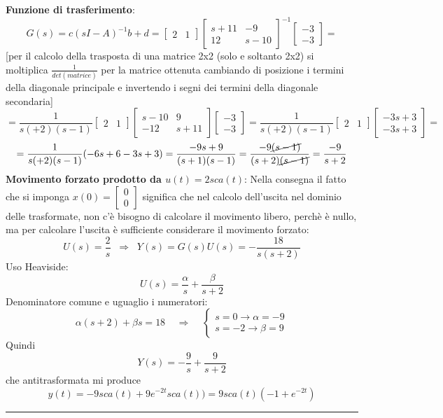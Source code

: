 \textbf{Funzione di trasferimento}:
\[
    G(s) = c(sI-A)^{-1} b +d = \left[\begin{matrix}
        2 &1
    \end{matrix}\right] \left[\begin{matrix}
        s+11 & -9 \\ 12 & s-10
    \end{matrix}\right]^{-1} \left[\begin{matrix}
        -3\\-3
    \end{matrix}\right] =
\]
[per il calcolo della trasposta di una matrice 2x2 (solo e soltanto 2x2) si moltiplica $\frac{1}{det(matrice)}$ per la matrice ottenuta cambiando di posizione i termini della diagonale principale e invertendo i segni dei termini della diagonale secondaria]
\[
    = \frac{1}{s(+2)(s-1)} \left[\begin{matrix}
        2 &1
    \end{matrix}\right] \left[\begin{matrix}
        s-10 & 9 \\ -12 & s+11
    \end{matrix}\right] \left[\begin{matrix}
        -3\\-3
    \end{matrix}\right] = \frac{1}{s(+2)(s-1)} \left[\begin{matrix}
        2 & 1
    \end{matrix}\right] \left[\begin{matrix}
        -3s+3\\-3s + 3
    \end{matrix}\right] =
\]
\[
    = \frac{1}{s(+2)(s-1)} (-6s + 6 -3s +3) = \frac{-9s +9}{(s+1)(s-1)} = \frac{-9 \cancel{(s-1)}}{(s+2)\cancel{(s-1)}} = \frac{-9}{s+2}
\]
\newline
\textbf{Movimento forzato prodotto da $u(t) = 2 sca(t)$}:\newline
Nella consegna il fatto che si imponga $x(0) = \left[\begin{matrix}
    0\\0
\end{matrix}\right]$ significa che nel calcolo dell'uscita nel dominio delle trasformate, non c'è bisogno di calcolare il movimento libero, perchè è nullo, ma per calcolare l'uscita è sufficiente considerare il movimento forzato:
\[
    U(s) = \frac{2}{s} \;\; \Rightarrow  \;\; Y(s) = G(s) U(s) = - \frac{18}{s(s+2)}
\]
Uso Heaviside:
\[
    U(s) = \frac{\alpha}{s} + \frac{\beta}{s+2}
\]
Denominatore comune e uguaglio i numeratori:
\[
    \alpha(s+2) + \beta s = 18 \;\;\;\; \Rightarrow \;\;\;\; \begin{cases}
        s= 0 \rightarrow \alpha = -9\\
        s = -2 \rightarrow  \beta = 9
    \end{cases}
\]
Quindi 
\[
    Y(s) = -\frac{9}{s} + \frac{9}{s+2}
\]
che antitrasformata mi produce
\[
    y(t) = - 9 sca(t) + 9 e^{-2t} sca(t)) = 9 sca(t) (-1 + e^{-2t})
\]
\rule{\textwidth}{0,4pt}

